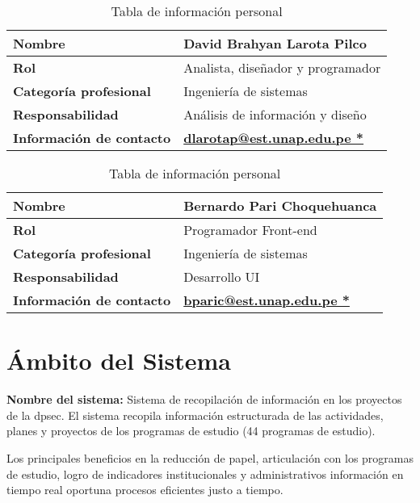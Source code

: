 \documentclass[12pt,a4paper]{article}
\begin{document}
\begin{table}[h!]
    \centering
    \begin{tabular}{|p{7cm}|p{8cm}|}
    \hline
    \rowcolor{pastelBlue} \textbf{Nombre} & David Brahyan Larota Pilco \\ \hline
    \textbf{Rol} & Analista, diseñador y programador \\ \hline
    \rowcolor{pastelBlue} \textbf{Categoría profesional} & Ingeniería de sistemas \\ \hline
    \textbf{Responsabilidad} & Análisis de información y diseño \\ \hline
    \rowcolor{pastelBlue} \textbf{Información de contacto} & \href{mailto:dlarotap@est.unap.edu.pe}{\textbf{dlarotap@est.unap.edu.pe *}} \\ \hline
    \end{tabular}
    \caption{Tabla de información personal}
    \label{tab:personal_info}
\end{table}

\begin{table}[h!]
    \centering
    \begin{tabular}{|p{7cm}|p{8cm}|}
    \hline
    \rowcolor{pastelBlue} \textbf{Nombre} & Bernardo Pari Choquehuanca \\ \hline
    \textbf{Rol} & Programador Front-end \\ \hline
    \rowcolor{pastelBlue} \textbf{Categoría profesional} & Ingeniería de sistemas \\ \hline
    \textbf{Responsabilidad}& Desarrollo UI \\ \hline
    \rowcolor{pastelBlue} \textbf{Información de contacto} & \href{mailto:bparic@est.unap.edu.pe}{\textbf{bparic@est.unap.edu.pe *}} \\ \hline
    \end{tabular}
    \caption{Tabla de información personal}
    \label{tab:personal_info2}
\end{table}

\FloatBarrier

\section{Ámbito del Sistema}
\textbf{Nombre del sistema:} Sistema de recopilación de información en los proyectos de la \gls{dpsec}.
\espacio 
El sistema recopila información estructurada de las actividades, planes y proyectos de los programas de estudio (44 programas de estudio).

\espacio 
Los principales beneficios en la reducción de papel, articulación con los programas de estudio, logro de indicadores institucionales y administrativos información en tiempo real oportuna procesos eficientes justo a tiempo.
\end{document}
